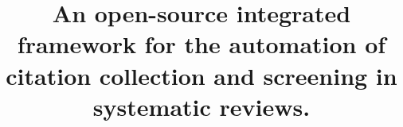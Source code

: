 \documentclass[]{bmcart}
\begin{document}
\begin{frontmatter}

\begin{fmbox}


\title{An open-source integrated framework for the automation of
citation collection and screening in systematic reviews.}


\author[
  addressref={aff1},
    corref={aff1},
    email={angelo.d.ambrosio@uniklinik-freiburg.de,a.dambrosioMD@gmail.com}
]{ }
\author[
  addressref={aff1},
    email={hajo.grundmann@uniklinik-freiburg.de}
]{ }
\author[
  addressref={aff1},
    email={tjibbe.donker@uniklinik-freiburg.de}
]{ }




\end{fmbox}
\end{frontmatter}
\end{document}
